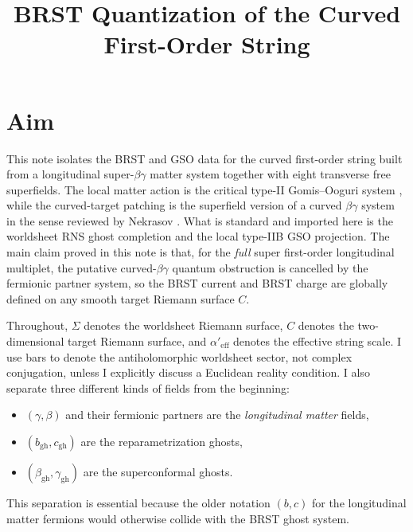 \documentclass[11pt]{article}
\title{BRST Quantization of the Curved First-Order String}
\author{}
\date{}
\newcommand{\Aeff}{\alpha'_{\mathrm{eff}}}
\newcommand{\gh}{\mathrm{gh}}
\begin{document}
\maketitle

\section{Aim}
This note isolates the BRST and GSO data for the curved first-order string built from a longitudinal super-$\beta\gamma$ matter system together with eight transverse free superfields. The local matter action is the critical type-II Gomis--Ooguri system \cite{gomis2000nonrelativisticclosedstringtheory}, while the curved-target patching is the superfield version of a curved $\beta\gamma$ system in the sense reviewed by Nekrasov \cite{nekrasov2005curvedbetagammasystems}. What is standard and imported here is the worldsheet RNS ghost completion and the local type-IIB GSO projection. The main claim proved in this note is that, for the \emph{full} super first-order longitudinal multiplet, the putative curved-$\beta\gamma$ quantum obstruction is cancelled by the fermionic partner system, so the BRST current and BRST charge are globally defined on any smooth target Riemann surface $C$.

Throughout, $\Sigma$ denotes the worldsheet Riemann surface, $C$ denotes the two-dimensional target Riemann surface, and $\Aeff$ denotes the effective string scale. I use bars to denote the antiholomorphic worldsheet sector, not complex conjugation, unless I explicitly discuss a Euclidean reality condition. I also separate three different kinds of fields from the beginning:
\begin{itemize}
\item $(\gamma,\beta)$ and their fermionic partners are the \emph{longitudinal matter} fields,
\item $(b_{\gh},c_{\gh})$ are the reparametrization ghosts,
\item $(\beta_{\gh},\gamma_{\gh})$ are the superconformal ghosts.
\end{itemize}
This separation is essential because the older notation $(b,c)$ for the longitudinal matter fermions would otherwise collide with the BRST ghost system.
\end{document}
